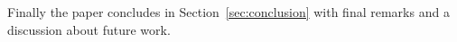 \documentclass[preprint,12pt,3p]{elsarticle}
\begin{document}
Finally the paper concludes in Section~\ref{sec:conclusion} with final remarks and a discussion about future work. 










% 
% 
% 
% 
% 
% 
% 
% 
% 
% 
% 
% 


\end{document}
